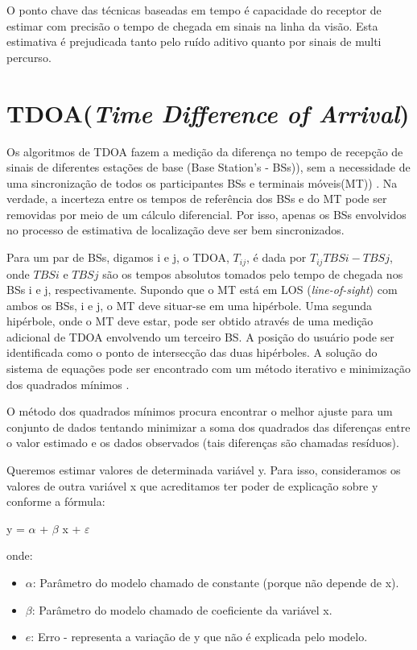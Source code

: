 O ponto chave das técnicas baseadas em tempo é capacidade do receptor de
estimar com precisão o tempo de chegada em sinais na linha da visão. Esta estimativa é prejudicada tanto pelo ruído 
aditivo quanto por sinais de multi percurso.

\section{TDOA(\textit{Time Difference of Arrival})}
  Os algoritmos de TDOA fazem a medição da diferença no tempo de recepção
de sinais de diferentes estações de base (Base Station's - BSs)), sem a necessidade de uma sincronização de
todos os participantes BSs e terminais móveis(MT)) \cite{tdoa}. Na verdade, a incerteza entre os tempos de referência
dos BSs e do MT pode ser removidas por meio de um cálculo diferencial. Por isso, apenas
os BSs envolvidos no processo de estimativa de localização deve ser bem sincronizados.

Para um par de BSs, digamos i e j, o TDOA,
$T_{ij}$, é dada por $T_{ij} TBSi - TBSj$, onde $TBSi$ e $TBSj$ são os tempos absolutos tomados 
pelo tempo de chegada nos BSs i e j, respectivamente. Supondo que o MT está em LOS (\textit{line-of-sight}) com ambos os BSs, i
e j, o MT deve situar-se em uma hipérbole. Uma segunda hipérbole, onde o
MT deve estar, pode ser obtido através de uma medição adicional de TDOA envolvendo
um terceiro BS. A posição do usuário pode ser identificada como o ponto de intersecção
das duas hipérboles. A solução do sistema de equações pode ser encontrado com um
método iterativo e minimização dos quadrados mínimos \cite{tdoa}.

O método dos quadrados mínimos procura encontrar 
o melhor ajuste para um conjunto de dados tentando minimizar a soma dos quadrados das diferenças 
entre o valor estimado e os dados observados (tais diferenças são chamadas resíduos).

Queremos estimar valores de determinada variável y. Para isso, consideramos os valores de outra variável x 
que acreditamos ter poder de explicação sobre y conforme a fórmula:

    y = $\alpha$ + $\beta$ x + $\varepsilon$

onde:
    \begin{itemize}
     \item $\alpha$: Parâmetro do modelo chamado de constante (porque não depende de x).
     \item  $\beta$: Parâmetro do modelo chamado de coeficiente da variável x.
     \item  $e$: Erro - representa a variação de y que não é explicada pelo modelo.
    \end{itemize}

